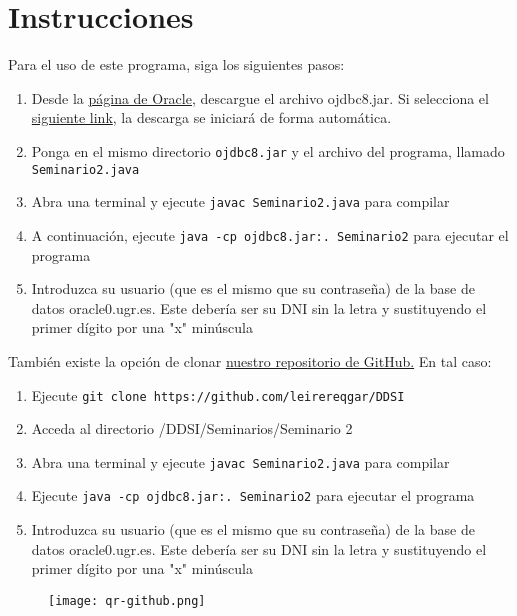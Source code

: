 \chapter{Instrucciones}
Para el uso de este programa, siga los siguientes pasos:
\begin{enumerate}
	\item Desde la \href{https://www.oracle.com/database/technologies/appdev/jdbc-ucp-19-7-c-downloads.html}{página de Oracle}, descargue el archivo ojdbc8.jar. Si selecciona el \href{https://download.oracle.com/otn-pub/otn_software/jdbc/197/ojdbc8.jar}{siguiente link}, la descarga se iniciará de forma automática.
	
	\item Ponga en el mismo directorio \texttt{ojdbc8.jar} y el archivo del programa, llamado \texttt{Seminario2.java}
	\item Abra una terminal y ejecute \texttt{javac Seminario2.java} para compilar
	\item A continuación, ejecute \texttt{java -cp ojdbc8.jar:. Seminario2} para ejecutar el programa
	\item Introduzca su usuario (que es el mismo que su contraseña) de la base de datos oracle0.ugr.es. Este debería ser su DNI sin la letra y sustituyendo el primer dígito por una "x" minúscula
\end{enumerate}

También existe la opción de clonar \href{https://github.com/leirereqgar/DDSI}{nuestro repositorio de GitHub.} En tal caso: 
\begin{enumerate}
	\item Ejecute \texttt{git clone https://github.com/leirereqgar/DDSI}
	\item Acceda al directorio /DDSI/Seminarios/Seminario 2
	\item Abra una terminal y ejecute \texttt{javac Seminario2.java} para compilar
	\item Ejecute \texttt{java -cp ojdbc8.jar:. Seminario2} para ejecutar el programa
	\item Introduzca su usuario (que es el mismo que su contraseña) de la base de datos oracle0.ugr.es. Este debería ser su DNI sin la letra y sustituyendo el primer dígito por una "x" minúscula
\end{enumerate}


\begin{figure}[!h]
  \centering
    \texttt{[image: qr-github.png]}
\end{figure}
